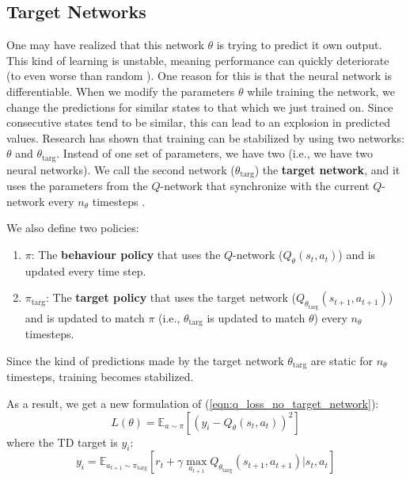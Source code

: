 \documentclass[journal, onecolumn, 12pt, draftclsnofoot]{IEEEtran}
\newcommand{\kword}[1]{\textbf{#1}}
\begin{document}
		\subsection{Target Networks}
		\par One may have realized that this network $\theta$ is trying to predict it own output. This kind of learning is unstable, meaning performance can quickly deteriorate (to even worse than random \cite{dqn}). One reason for this is that the neural network is differentiable. When we modify the parameters $\theta$ while training the network, we change the predictions for similar states to that which we just trained on. Since consecutive states tend to be similar, this can lead to an explosion in predicted values. Research has shown that training can be stabilized by using two networks: $\theta$ and $\theta_\text{targ}$. Instead of one set of parameters, we have two (i.e., we have two neural networks). We call the second network ($\theta_\text{targ}$) the \kword{target network}, and it uses the parameters from the $Q$-network that synchronize with the current $Q$-network every $n_\theta$ timesteps \cite{dqn}.
		\par We also define two policies:
		\begin{enumerate}
			\item $\pi$: The \kword{behaviour policy} that uses the $Q$-network ($Q_\theta (s_t,a_t)$) and is updated every time step.
			\item $\pi_\text{targ}$: The \kword{target policy} that uses the target network ($Q_{\theta_\text{targ}} (s_{t+1},a_{t+1})$) and is updated to match $\pi$ (i.e., $\theta_\text{targ}$ is updated to match $\theta$) every $n_\theta$ timesteps.
		\end{enumerate}
		Since the kind of predictions made by the target network $\theta_\text{targ}$ are static for $n_\theta$ timesteps, training becomes stabilized.
		\par As a result, we get a new formulation of (\ref{eqn:q_loss_no_target_network}):
		\begin{equation}
				\label{eqn:q_loss_target_network}
				L(\theta) = \mathbb{E}_{a \sim \pi} \left[ (y_i - Q_\theta(s_t,a_t))^2 \right]
		\end{equation}
		where the TD target is $y_i$:
		\begin{equation}
			\label{eqn:y_i_target_network}
			y_i = \mathbb{E}_{a_{t+1} \sim \pi_\text{targ}} \left[ r_t + \gamma \max_{a_{t+1}}Q_{\theta_\text{targ}}(s_{t+1}, a_{t+1}) \big\vert s_t, a_t \right]
		\end{equation}
\end{document}

